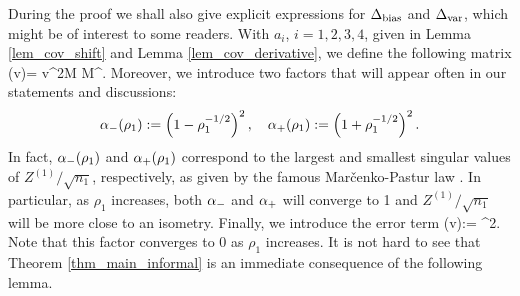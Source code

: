 During the proof we shall also give explicit expressions for $\Delta_{\text{bias}}$ and $\Delta_{\text{var}}$, which might be of interest to some readers.
With $a_i$, $i=1,2,3,4$, given in Lemma \ref{lem_cov_shift} and Lemma \ref{lem_cov_derivative},
we define the following matrix
\be\label{defnpihat}\Pi \equiv \Pi(\wh v)= \cdot \wh v^2{M}  {M}^{\top}.\ee
Moreover, we introduce two factors that will appear often in our statements and discussions:
$$\alpha_-(\rho_1):=\left(1- \rho_1^{-1/2}\right)^2,\quad \alpha_+(\rho_1):=\left(1 + \rho_1^{-1/2}\right)^2.$$
In fact, $\alpha_-(\rho_1)$ and $\alpha_+(\rho_1)$ correspond to the largest and smallest singular values of $Z^{(1)}/\sqrt{n_1}$, respectively, as given by the famous Mar{\v c}enko-Pastur law \cite{MP}. In particular, as $\rho_1$ increases, both $\alpha_-$ and $\alpha_+$ will converge to 1 and $Z^{(1)}/\sqrt{n_1}$ will be more close to an isometry. Finally, we introduce the error term
\be\label{eq_deltaextra}
 \delta(\wh v):= \cdot  {}^2.\ee
Note that this factor converges to 0 as $\rho_1$ increases. It is not hard to see that Theorem \ref{thm_main_informal} is an immediate consequence of the following lemma.






